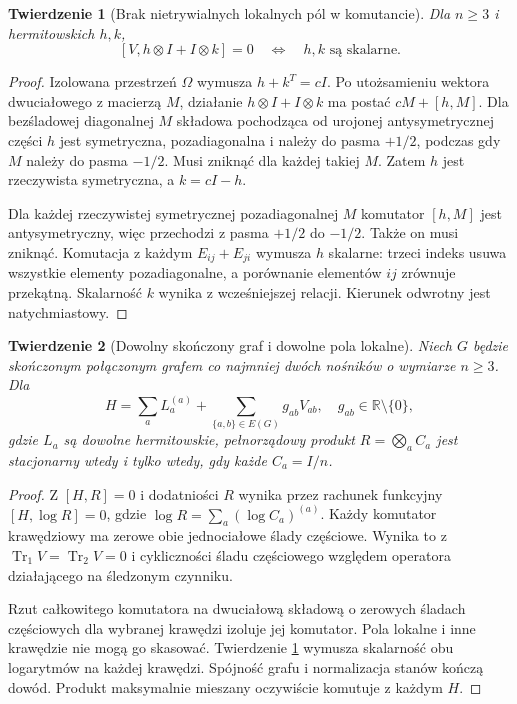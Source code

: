 \documentclass[11pt,a4paper]{article}
\newtheorem{theorem}{Twierdzenie}
\newcommand{\Tr}{\operatorname{Tr}}
\begin{document}
\begin{theorem}[Brak nietrywialnych lokalnych pól w komutancie]\label{thm:local}
Dla $n\ge3$ i hermitowskich $h,k$,
\[
 [V,h\otimes I+I\otimes k]=0
 \quad\Longleftrightarrow\quad h,k\text{ są skalarne}.
\]
\end{theorem}

\begin{proof}
Izolowana przestrzeń $\Omega$ wymusza $h+k^T=cI$.
Po utożsamieniu wektora dwuciałowego z macierzą $M$, działanie
$h\otimes I+I\otimes k$ ma postać $cM+[h,M]$.
Dla bezśladowej diagonalnej $M$ składowa pochodząca od urojonej
antysymetrycznej części $h$ jest symetryczna, pozadiagonalna
i należy do pasma $+1/2$, podczas gdy $M$ należy do pasma $-1/2$.
Musi zniknąć dla każdej takiej $M$. Zatem $h$ jest rzeczywista
symetryczna, a $k=cI-h$.

Dla każdej rzeczywistej symetrycznej pozadiagonalnej $M$ komutator
$[h,M]$ jest antysymetryczny, więc przechodzi z pasma $+1/2$ do $-1/2$.
Także on musi zniknąć. Komutacja z każdym $E_{ij}+E_{ji}$ wymusza
$h$ skalarne: trzeci indeks usuwa wszystkie elementy pozadiagonalne,
a porównanie elementów $ij$ zrównuje przekątną. Skalarność $k$ wynika
z wcześniejszej relacji. Kierunek odwrotny jest natychmiastowy.
\end{proof}

\begin{theorem}[Dowolny skończony graf i dowolne pola lokalne]\label{thm:product}
Niech $G$ będzie skończonym połączonym grafem co najmniej dwóch
nośników o wymiarze $n\ge3$. Dla
\[
 H=\sum_a L_a^{(a)}+\sum_{\{a,b\}\in E(G)}g_{ab}V_{ab},\quad
 g_{ab}\in\mathbb R\setminus\{0\},
\]
gdzie $L_a$ są dowolne hermitowskie, pełnorządowy produkt
$R=\bigotimes_a C_a$ jest stacjonarny wtedy i tylko wtedy,
gdy każde $C_a=I/n$.
\end{theorem}

\begin{proof}
Z $[H,R]=0$ i dodatniości $R$ wynika przez rachunek funkcyjny
$[H,\log R]=0$, gdzie $\log R=\sum_a(\log C_a)^{(a)}$.
Każdy komutator krawędziowy ma zerowe obie jednociałowe ślady
częściowe. Wynika to z $\Tr_1V=\Tr_2V=0$ i cykliczności śladu
częściowego względem operatora działającego na śledzonym czynniku.

Rzut całkowitego komutatora na dwuciałową składową o zerowych
śladach częściowych dla wybranej krawędzi izoluje jej komutator.
Pola lokalne i inne krawędzie nie mogą go skasować. Twierdzenie
\ref{thm:local} wymusza skalarność obu logarytmów na każdej krawędzi.
Spójność grafu i normalizacja stanów kończą dowód. Produkt
maksymalnie mieszany oczywiście komutuje z każdym $H$.
\end{proof}
\end{document}
